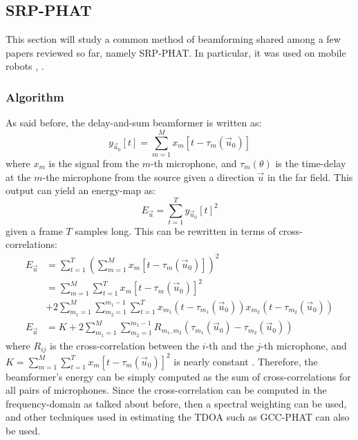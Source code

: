\documentclass[notitlepage]{report}
\begin{document}
\subsection{SRP-PHAT}

This section will study a common method of beamforming shared among a few papers reviewed so far, namely SRP-PHAT. In particular, it was used on mobile robots \cite{valin_localization_2004}, \cite{valin_robust_2007}.

\subsubsection{Algorithm}

As said before, the delay-and-sum beamformer is written as:
\begin{equation}
y_{\vec{u}_0}[t] = \sum_{m=1}^M x_m[t-\tau_m(\vec{u}_0)] 
\end{equation}
where $x_m$ is the signal from the $m$-th microphone, and $\tau_m(\theta)$ is the time-delay at the $m$-the microphone from the source given a direction $\vec{u}$ in the far field. This output can yield an energy-map as:
\begin{equation}
E_{\vec{u}} = \sum_{t=1}^T y_{\vec{u}_0}[t]^2
\end{equation}
given a frame $T$ samples long. This can be rewritten in terms of cross-correlations:
\begin{equation}
\begin{split}
E_{\vec{u}} &= \sum_{t=1}^T \left( \sum_{m=1}^M x_m[t-\tau_m(\vec{u}_0)] \right)^2 \\
&= \sum_{m=1}^{M} \sum_{t=1}^T x_m[t - \tau_m(\vec{u}_0)]^2 \\
&+ 2 \sum_{m_1=1}^M \sum_{m_2=1}^{m_1-1} 
\sum_{t=1}^T x_{m_1}\left(t - \tau_{m_1}(\vec{u}_0)\right) x_{m_2}\left(t - \tau_{m_2}(\vec{u}_0)\right) \\
E_{\vec{u}} &= K 
+ 2 \sum_{m_1=1}^M \sum_{m_2=1}^{m_1-1} R_{m_1,m_2} (\tau_{m_1}(\vec{u}_0) - \tau_{m_2}(\vec{u}_0))
\end{split}
\end{equation}
where $R_{ij}$ is the cross-correlation between the $i$-th and the $j$-th microphone, and $K = \sum_{m=1}^{M} \sum_{t=1}^T x_m[t - \tau_m(\vec{u}_0)]^2$ is nearly constant \cite{valin_localization_2004} \cite{valin_robust_2007}. Therefore, the beamformer's energy can be simply computed as the sum of cross-correlations for all pairs of microphones. Since the cross-correlation can be computed in the frequency-domain as talked about before, then a spectral weighting can be used, and other techniques used in estimating the TDOA such as GCC-PHAT can also be used.
\end{document}
